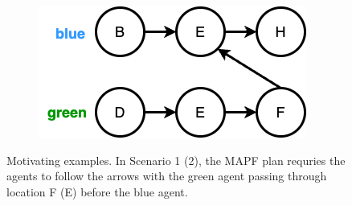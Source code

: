 \documentclass[letterpaper]{article} %
\theoremstyle{definition}
\begin{document}
\begin{figure}[t]
\begin{subfigure}[b]{0.12\textwidth}
         \label{motivating2}
    \end{subfigure}\hfill
    \begin{subfigure}[b]{0.2\textwidth}
         \centering
         \includegraphics[width=\textwidth]{./Figs/TPG_right.png}
             \label{fig: adapted TPG}
    \end{subfigure}
    \caption{Motivating examples. In Scenario 1 (2), the MAPF plan requries the agents to follow the arrows with the green agent passing through location F (E) before the blue agent.}
    \label{motivating}

\end{figure}


\end{document}
